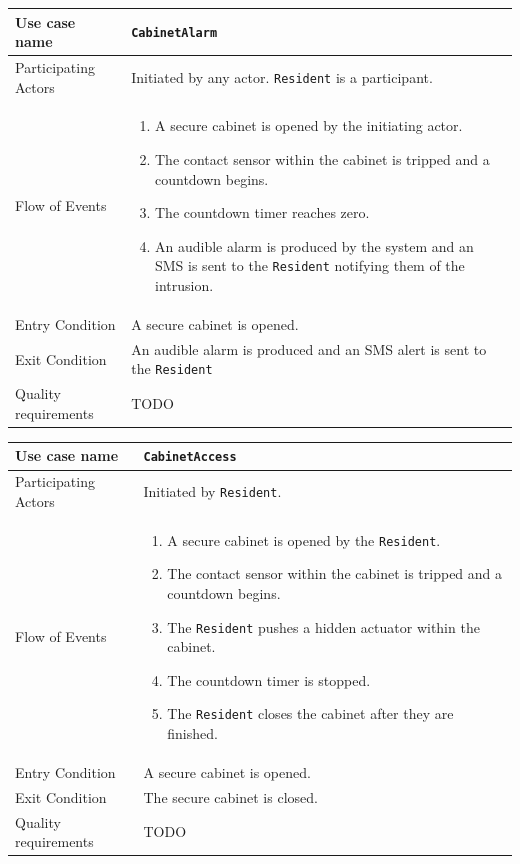 \documentclass{report}
\begin{document}
\begin{tabular}{| l | p{12cm} |}
\hline
Use case name & \texttt{CabinetAlarm} \\ \hline
Participating Actors & Initiated by any actor. \texttt{Resident} is a participant. \\ \hline
Flow of Events & 

\begin{enumerate}
 \item A secure cabinet is opened by the initiating actor.
 \item The contact sensor within the cabinet is tripped and a countdown begins.
 \item The countdown timer reaches zero.
 \item An audible alarm is produced by the system and an SMS is sent to the
       \texttt{Resident} notifying them of the intrusion.
\end{enumerate}

\\ \hline

Entry Condition & A secure cabinet is opened. \\ \hline
Exit Condition & An audible alarm is produced and an SMS alert is sent to
                 the \texttt{Resident} \\ \hline
Quality requirements & TODO \\ \hline

\hline
\end{tabular}

\begin{tabular}{| l | p{12cm} |}
\hline
Use case name & \texttt{CabinetAccess} \\ \hline
Participating Actors & Initiated by \texttt{Resident}. \\ \hline
Flow of Events & 

\begin{enumerate}
 \item A secure cabinet is opened by the \texttt{Resident}.
 \item The contact sensor within the cabinet is tripped and a countdown begins.
 \item The \texttt{Resident} pushes a hidden actuator within the cabinet.
 \item The countdown timer is stopped.
 \item The \texttt{Resident} closes the cabinet after they are finished.
\end{enumerate}

\\ \hline

Entry Condition & A secure cabinet is opened. \\ \hline
Exit Condition & The secure cabinet is closed. \\ \hline
Quality requirements & TODO \\ \hline

\hline
\end{tabular}
\end{document}
